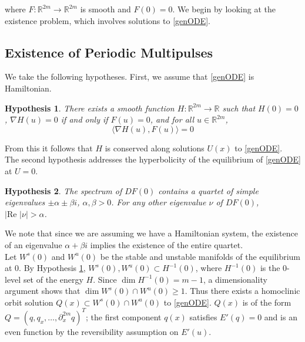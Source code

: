 \documentclass[12pt]{article}
\def\R{{\mathbb R}}
\DeclareMathOperator{\dm}{dim}
\newtheorem{hypothesis}{Hypothesis}
\begin{document}
where $F: \R^{2m} \rightarrow \R^{2m}$ is smooth and $F(0) = 0$. We begin by looking at the existence problem, which involves solutions to \eqref{genODE}.

\subsection{Existence of Periodic Multipulses}

We take the following hypotheses. First, we assume that \eqref{genODE} is Hamiltonian.

\begin{hypothesis}\label{Hhyp}
There exists a smooth function $H: \R^{2m} \rightarrow \R$ such that $H(0) = 0$, $\nabla H(u) = 0$ if and only if $F(u) = 0$, and for all $u \in \R^{2m}$,
\begin{equation}
\langle \nabla H(u), F(u) \rangle = 0
\end{equation}
\end{hypothesis}

From this it follows that $H$ is conserved along solutions $U(x)$ to \eqref{genODE}.\\

The second hypothesis addresses the hyperbolicity of the equilibrium of \eqref{genODE} at $U = 0$.  

\begin{hypothesis}\label{hypeq}
The spectrum of $DF(0)$ contains a quartet of simple eigenvalues $\pm \alpha \pm \beta i$, $\alpha, \beta > 0$. For any other eigenvalue $\nu$ of $DF(0)$, $|\text{Re }|\nu| > \alpha$.
\end{hypothesis}

We note that since we are assuming we have a Hamiltonian system, the existence of an eigenvalue $\alpha + \beta i$ implies the existence of the entire quartet.\\

Let $W^s(0)$ and $W^u(0)$ be the stable and unstable manifolds of the equilibrium at 0. By Hypothesis \ref{Hhyp}, $W^s(0), W^u(0) \subset H^{-1}(0)$, where $H^{-1}(0)$ is the 0-level set of the energy $H$. Since $\dm H^{-1}(0) = m-1$, a dimensionality argument shows that $\dim W^s(0) \cap W^u(0) \geq 1$. Thus there exists a homoclinic orbit solution $Q(x) \subset W^s(0) \cap W^u(0)$ to \eqref{genODE}. $Q(x)$ is of the form $Q = (q, q_x, \dots, \partial_x^{2m} q)^T$; the first component $q(x)$ satisfies $E'(q) = 0$ and is an even function by the reversibility assumption on $E'(u)$.\\
\end{document}
